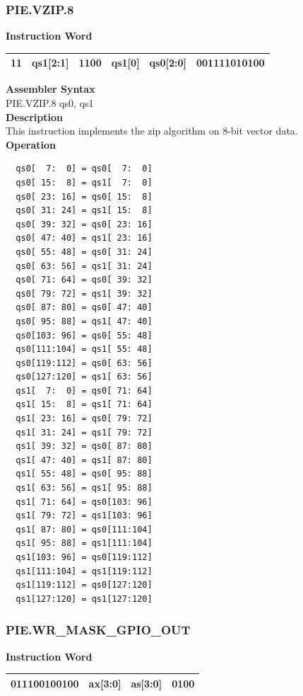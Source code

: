 \newpage
\subsubsection{PIE.VZIP.8}\label{instruction:PIEVZIP8}
\setlength\tabcolsep{6pt}
\textbf{Instruction Word} \\
\begin{tabular}{|c|c|c|c|c|c|}
	\hline
	11 & qs1[2:1] & 1100 & qs1[0] & qs0[2:0] & 001111010100 \\
	\hline
\end{tabular}

\textbf{Assembler Syntax} \\
PIE.VZIP.8 qs0, qs1 \\
\textbf{Description} \\
This instruction implements the zip algorithm on 8-bit vector data.\\
\textbf{Operation}
\begin{lstlisting}
  qs0[  7:  0] = qs0[  7:  0]
  qs0[ 15:  8] = qs1[  7:  0]
  qs0[ 23: 16] = qs0[ 15:  8]
  qs0[ 31: 24] = qs1[ 15:  8]
  qs0[ 39: 32] = qs0[ 23: 16]
  qs0[ 47: 40] = qs1[ 23: 16]
  qs0[ 55: 48] = qs0[ 31: 24]
  qs0[ 63: 56] = qs1[ 31: 24]
  qs0[ 71: 64] = qs0[ 39: 32]
  qs0[ 79: 72] = qs1[ 39: 32]
  qs0[ 87: 80] = qs0[ 47: 40]
  qs0[ 95: 88] = qs1[ 47: 40]
  qs0[103: 96] = qs0[ 55: 48]
  qs0[111:104] = qs1[ 55: 48]
  qs0[119:112] = qs0[ 63: 56]
  qs0[127:120] = qs1[ 63: 56]
  qs1[  7:  0] = qs0[ 71: 64]
  qs1[ 15:  8] = qs1[ 71: 64]
  qs1[ 23: 16] = qs0[ 79: 72]
  qs1[ 31: 24] = qs1[ 79: 72]
  qs1[ 39: 32] = qs0[ 87: 80]
  qs1[ 47: 40] = qs1[ 87: 80]
  qs1[ 55: 48] = qs0[ 95: 88]
  qs1[ 63: 56] = qs1[ 95: 88]
  qs1[ 71: 64] = qs0[103: 96]
  qs1[ 79: 72] = qs1[103: 96]
  qs1[ 87: 80] = qs0[111:104]
  qs1[ 95: 88] = qs1[111:104]
  qs1[103: 96] = qs0[119:112]
  qs1[111:104] = qs1[119:112]
  qs1[119:112] = qs0[127:120]
  qs1[127:120] = qs1[127:120]
\end{lstlisting}

\newpage
\subsubsection{PIE.WR\_MASK\_GPIO\_OUT}\label{instruction:PIEWRMASKGPIOOUT}
\setlength\tabcolsep{6pt}
\textbf{Instruction Word} \\
\begin{tabular}{|c|c|c|c|}
	\hline
	011100100100 & ax[3:0] & as[3:0] & 0100 \\
	\hline
\end{tabular}

